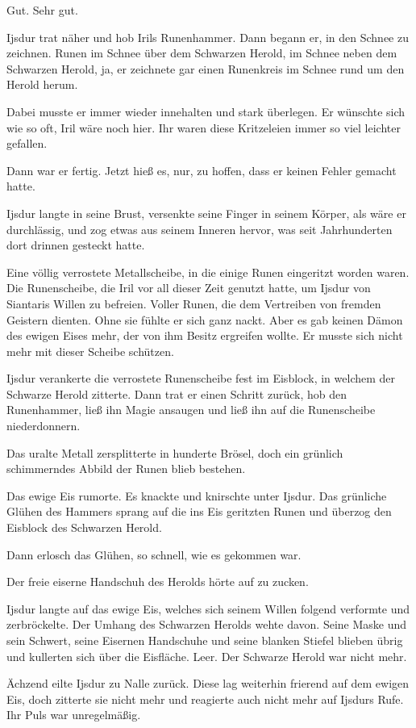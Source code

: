 Gut. Sehr gut.

Ijsdur trat näher und hob Irils Runenhammer. Dann begann er, in den Schnee zu zeichnen. Runen im Schnee über dem Schwarzen Herold, im Schnee neben dem Schwarzen Herold, ja, er zeichnete gar einen Runenkreis im Schnee rund um den Herold herum.

Dabei musste er immer wieder innehalten und stark überlegen. Er wünschte sich wie so oft, Iril wäre noch hier. Ihr waren diese Kritzeleien immer so viel leichter gefallen.

Dann war er fertig. Jetzt hieß es, nur, zu hoffen, dass er keinen Fehler gemacht hatte.

Ijsdur langte in seine Brust, versenkte seine Finger in seinem Körper, als wäre er durchlässig, und zog etwas aus seinem Inneren hervor, was seit Jahrhunderten dort drinnen gesteckt hatte.

Eine völlig verrostete Metallscheibe, in die einige Runen eingeritzt worden waren. Die Runenscheibe, die Iril vor all dieser Zeit genutzt hatte, um Ijsdur von Siantaris Willen zu befreien. Voller Runen, die dem Vertreiben von fremden Geistern dienten. Ohne sie fühlte er sich ganz nackt. Aber es gab keinen Dämon des ewigen Eises mehr, der von ihm Besitz ergreifen wollte. Er musste sich nicht mehr mit dieser Scheibe schützen.

Ijsdur verankerte die verrostete Runenscheibe fest im Eisblock, in welchem der Schwarze Herold zitterte. Dann trat er einen Schritt zurück, hob den Runenhammer, ließ ihn Magie ansaugen und ließ ihn auf die Runenscheibe niederdonnern.

Das uralte Metall zersplitterte in hunderte Brösel, doch ein grünlich schimmerndes Abbild der Runen blieb bestehen.

Das ewige Eis rumorte. Es knackte und knirschte unter Ijsdur. Das grünliche Glühen des Hammers sprang auf die ins Eis geritzten Runen und überzog den Eisblock des Schwarzen Herold.

Dann erlosch das Glühen, so schnell, wie es gekommen war.

Der freie eiserne Handschuh des Herolds hörte auf zu zucken.

Ijsdur langte auf das ewige Eis, welches sich seinem Willen folgend verformte und zerbröckelte. Der Umhang des Schwarzen Herolds wehte davon. Seine Maske und sein Schwert, seine Eisernen Handschuhe und seine blanken Stiefel blieben übrig und kullerten sich über die Eisfläche. Leer. Der Schwarze Herold war nicht mehr.

Ächzend eilte Ijsdur zu Nalle zurück. Diese lag weiterhin frierend auf dem ewigen Eis, doch zitterte sie nicht mehr und reagierte auch nicht mehr auf Ijsdurs Rufe. Ihr Puls war unregelmäßig.

